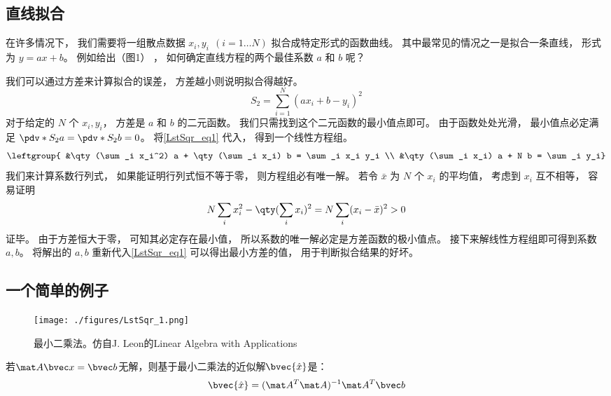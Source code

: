
\begin{issues}
\issueTODO
\end{issues}


\subsection{直线拟合}
在许多情况下， 我们需要将一组散点数据 $x_i, y_i \ \ (i = 1\dots N)$ 拟合成特定形式的函数曲线。 其中最常见的情况之一是拟合一条直线， 形式为 $y = ax + b$。 例如给出（图1）%
， 如何确定直线方程的两个最佳系数 $a$ 和 $b$ 呢？

我们可以通过方差来计算拟合的误差， 方差越小则说明拟合得越好。
\begin{equation}\label{LstSqr_eq1}
S_2 = \sum_{i = 1}^N (a x_i + b - y_i)^2
\end{equation}
对于给定的 $N$ 个 $x_i, y_i$， 方差是 $a$ 和 $b$ 的二元函数。 我们只需找到这个二元函数的最小值点即可。 由于函数处处光滑， 最小值点必定满足 $\pdv*{S_2}{a} = \pdv*{S_2}{b} = 0$。 将\autoref{LstSqr_eq1} 代入， 得到一个线性方程组。
\begin{equation}
\leftgroup{
&\qty(\sum_i x_i^2) a + \qty(\sum_i x_i) b = \sum_i x_i y_i \\
&\qty(\sum_i x_i) a + N b = \sum_i y_i}
\end{equation}
我们来计算系数行列式， 如果能证明行列式恒不等于零， 则方程组必有唯一解。%
若令 $\bar x$ 为 $N$ 个 $x_i$ 的平均值， 考虑到 $x_i$ 互不相等， 容易证明
\begin{equation}
N\sum_i x_i^2 - \qty(\sum_i x_i)^2 = N\sum_i (x_i - \bar x)^2 > 0
\end{equation}
证毕。 由于方差恒大于零， 可知其必定存在最小值， 所以系数的唯一解必定是方差函数的极小值点。 接下来解线性方程组即可得到系数 $a, b$。 将解出的 $a,b$ 重新代入\autoref{LstSqr_eq1} 可以得出最小方差的值， 用于判断拟合结果的好坏。

\subsection{一个简单的例子}
\begin{figure}[ht]
\centering
\texttt{[image: ./figures/LstSqr\_1.png]}
\caption{最小二乘法。仿自J. Leon的Linear Algebra with Applications} \label{LstSqr_fig1}
\end{figure}
若$\mat A \bvec x = \bvec b$无解，则基于最小二乘法的近似解$\bvec {\hat x} $是：
\begin{equation}
\bvec {\hat x} = (\mat A^T \mat A)^{-1}\mat A^T \bvec b
\end{equation}

